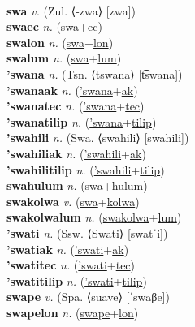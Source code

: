  \label{'swensektilip} \\
\textbf{swa} \textit{v.} (Zul. ⟨-zwa⟩ [zwa])
 \label{swa} \\
\textbf{swaec} \textit{n.} (\hyperref[swa]{swa}+\hyperref[ec]{ec})
 \label{swaec} \\
\textbf{swalon} \textit{n.} (\hyperref[swa]{swa}+\hyperref[lon]{lon})
 \label{swalon} \\
\textbf{swalum} \textit{n.} (\hyperref[swa]{swa}+\hyperref[lum]{lum})
 \label{swalum} \\
\textbf{'swana} \textit{n.} (Tsn. ⟨tswana⟩ [t͡swana])
 \label{'swana} \\
\textbf{'swanaak} \textit{n.} (\hyperref['swana]{'swana}+\hyperref[ak]{ak})
 \label{'swanaak} \\
\textbf{'swanatec} \textit{n.} (\hyperref['swana]{'swana}+\hyperref[tec]{tec})
 \label{'swanatec} \\
\textbf{'swanatilip} \textit{n.} (\hyperref['swana]{'swana}+\hyperref[tilip]{tilip})
 \label{'swanatilip} \\
\textbf{'swahili} \textit{n.} (Swa. ⟨swahili⟩ [swahili])
 \label{'swahili} \\
\textbf{'swahiliak} \textit{n.} (\hyperref['swahili]{'swahili}+\hyperref[ak]{ak})
 \label{'swahiliak} \\
\textbf{'swahilitilip} \textit{n.} (\hyperref['swahili]{'swahili}+\hyperref[tilip]{tilip})
 \label{'swahilitilip} \\
\textbf{swahulum} \textit{n.} (\hyperref[swa]{swa}+\hyperref[hulum]{hulum})
 \label{swahulum} \\
\textbf{swakolwa} \textit{v.} (\hyperref[swa]{swa}+\hyperref[kolwa]{kolwa})
 \label{swakolwa} \\
\textbf{swakolwalum} \textit{n.} (\hyperref[swakolwa]{swakolwa}+\hyperref[lum]{lum})
 \label{swakolwalum} \\
\textbf{'swati} \textit{n.} (Ssw. ⟨Swati⟩ [swatˈi])
 \label{'swati} \\
\textbf{'swatiak} \textit{n.} (\hyperref['swati]{'swati}+\hyperref[ak]{ak})
 \label{'swatiak} \\
\textbf{'swatitec} \textit{n.} (\hyperref['swati]{'swati}+\hyperref[tec]{tec})
 \label{'swatitec} \\
\textbf{'swatitilip} \textit{n.} (\hyperref['swati]{'swati}+\hyperref[tilip]{tilip})
 \label{'swatitilip} \\
\textbf{swape} \textit{v.} (Spa. ⟨suave⟩ [ˈswaβe])
 \label{swape} \\
\textbf{swapelon} \textit{n.} (\hyperref[swape]{swape}+\hyperref[lon]{lon})
